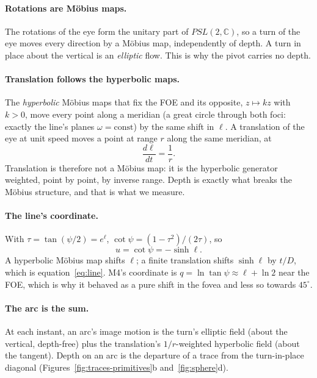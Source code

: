 \documentclass[11pt,a4paper]{article}
\begin{document}
\paragraph{Rotations are M\"obius maps.} The rotations of the eye form the unitary part of $PSL(2,\mathbb C)$, so a turn
of the eye moves every direction by a M\"obius map, independently of depth. A turn in place about the vertical is an
\emph{elliptic} flow. This is why the pivot carries no depth.

\paragraph{Translation follows the hyperbolic maps.} The \emph{hyperbolic} M\"obius maps that fix the FOE and its opposite,
$z\mapsto kz$ with $k>0$, move every point along a meridian (a great circle through both foci: exactly the line's planes
$\omega=\text{const}$) by the same shift in $\ell$. A translation of the eye at unit speed moves a point at range $r$ along
the same meridian, at
\begin{equation}\label{eq:dl}
  \frac{d\ell}{dt} = \frac{1}{r}.
\end{equation}
Translation is therefore not a M\"obius map: it is the hyperbolic generator weighted, point by point, by inverse range.
Depth is exactly what breaks the M\"obius structure, and that is what we measure.

\paragraph{The line's coordinate.} With $\tau=\tan(\psi/2)=e^{\ell}$, $\cot\psi=(1-\tau^2)/(2\tau)$, so
\begin{equation}\label{eq:sinh}
  u=\cot\psi=-\sinh\ell .
\end{equation}
A hyperbolic M\"obius map shifts $\ell$; a finite translation shifts $\sinh\ell$ by $t/D$, which is
equation~\eqref{eq:line}. M4's coordinate is $q=\ln\tan\psi\approx\ell+\ln2$ near the FOE, which is why it behaved as a
pure shift in the fovea and less so towards $45^\circ$.

\paragraph{The arc is the sum.} At each instant, an arc's image motion is the turn's elliptic field (about the vertical,
depth-free) plus the translation's $1/r$-weighted hyperbolic field (about the tangent). Depth on an arc is the
departure of a trace from the turn-in-place diagonal (Figures~\ref{fig:traces-primitives}b and~\ref{fig:sphere}d).
\end{document}
